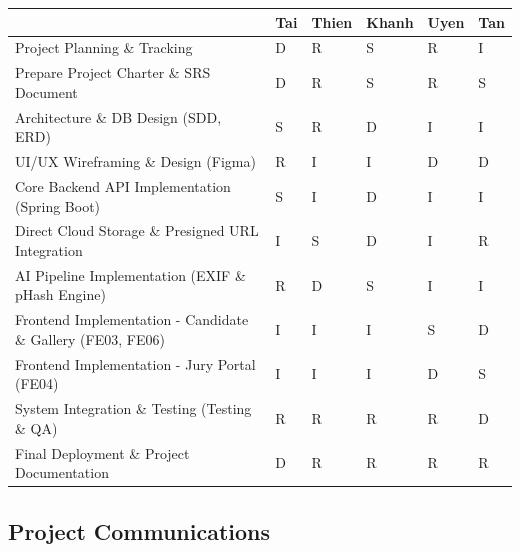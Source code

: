 \renewcommand{\arraystretch}{1.15}
\setlength{\tabcolsep}{4pt}
\begin{longtable}{|>{\raggedright\arraybackslash}p{}|>{\centering\arraybackslash}p{}|>{\centering\arraybackslash}p{}|>{\centering\arraybackslash}p{}|>{\centering\arraybackslash}p{}|>{\centering\arraybackslash}p{}|}
\hline
\multicolumn{1}{|c|}{\textbf{Responsibility}} & \textbf{Tai} & \textbf{Thien} & \textbf{Khanh} & \textbf{Uyen} & \textbf{Tan} \\
\hline
Project Planning \& Tracking & D & R & S & R & I \\
\hline
Prepare Project Charter \& SRS Document & D & R & S & R & S \\
\hline
Architecture \& DB Design (SDD, ERD) & S & R & D & I & I \\
\hline
UI/UX Wireframing \& Design (Figma) & R & I & I & D & D \\
\hline
Core Backend API Implementation (Spring Boot) & S & I & D & I & I \\
\hline
Direct Cloud Storage \& Presigned URL Integration & I & S & D & I & R \\
\hline
AI Pipeline Implementation (EXIF \& pHash Engine) & R & D & S & I & I \\
\hline
Frontend Implementation - Candidate \& Gallery (FE03, FE06) & I & I & I & S & D \\
\hline
Frontend Implementation - Jury Portal (FE04) & I & I & I & D & S \\
\hline
System Integration \& Testing (Testing \& QA) & R & R & R & R & D \\
\hline
Final Deployment \& Project Documentation & D & R & R & R & R \\
\hline
\end{longtable}

\subsection{Project Communications}
\label{subsec:ii_project_communications}

